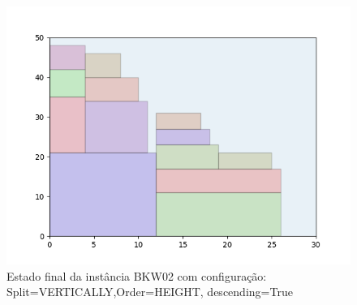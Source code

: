 \begin{figure}[H]
    \centering
    \caption[]{Estado final da instância BKW02 com configuração: Split=VERTICALLY,Order=HEIGHT, descending=True}
    \label{fig:bkw02-vertically-height-true}
    \includegraphics[scale=0.5]{output/figures/bkw/bkw02/vertically/height/true/00}
\end{figure}